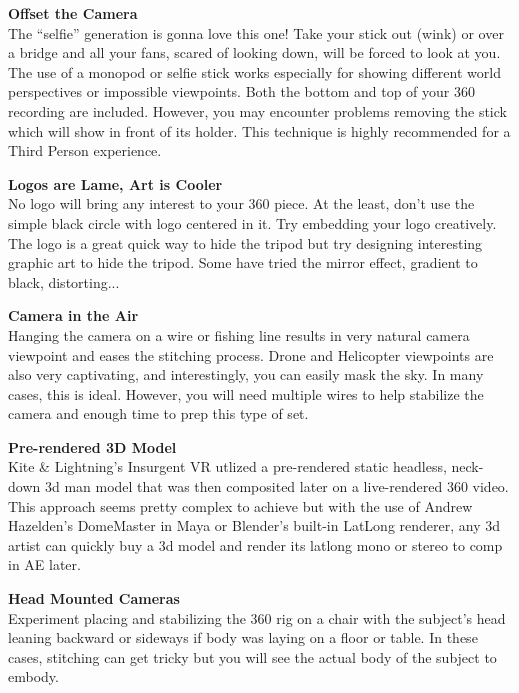 \begin{fullwidth}

{\bfseries Offset the Camera}
\\
The “selfie” generation is gonna love this one! Take your stick out (wink) or over a bridge and all your fans, scared of looking down, will be forced to look at you. The use of a monopod or selfie stick works especially for showing different world perspectives or impossible viewpoints. Both the bottom and top of your 360 recording are included. However, you may encounter problems removing the stick which will show in front of its holder. This technique is highly recommended for a Third Person experience.


{\bfseries Logos are Lame, Art is Cooler}
\\
No logo will bring any interest to your 360 piece. At the least, don’t use the simple black circle with logo centered in it. Try embedding your logo creatively. The logo is a great quick way to hide the tripod but try designing interesting graphic art to hide the tripod. Some have tried the mirror effect, gradient to black, distorting... 

\clearpage
{\bfseries Camera in the Air}
\\
Hanging the camera on a wire or fishing line results in very natural camera viewpoint and eases the stitching process. Drone and Helicopter viewpoints are also very captivating, and interestingly, you can easily mask the sky. In many cases, this is ideal. However, you will need multiple wires to help stabilize the camera and enough time to prep this type of set.


{\bfseries Pre-rendered 3D Model}
\\
Kite & Lightning’s Insurgent VR utlized a pre-rendered static headless, neck-down 3d man model that was then composited later on a live-rendered 360 video. This approach seems pretty complex to achieve but with the use of Andrew Hazelden's DomeMaster in Maya or Blender's built-in LatLong renderer, any 3d artist can quickly buy a 3d model and render its latlong mono or stereo to comp in AE later. 

\clearpage
{\bfseries Head Mounted Cameras}
\\
Experiment placing and stabilizing the 360 rig on a chair with the subject’s head leaning backward or sideways if body was laying on a floor or table. In these cases, stitching can get tricky but you will see the actual body of the subject to embody.


\end{fullwidth}
